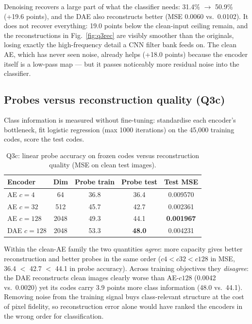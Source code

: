 \documentclass[10pt,twocolumn,letterpaper]{article}
\begin{document}
Denoising recovers a large part of what the classifier needs: 31.4\% $\to$ 50.9\% (+19.6 points), and the DAE also reconstructs better (MSE 0.0060 vs.\ 0.0102).
It does not recover everything: 19.0 points below the clean-input ceiling remain, and the reconstructions in Fig.~\ref{fig:q3rec} are visibly smoother than the originals, losing exactly the high-frequency detail a CNN filter bank feeds on.
The clean AE, which has never seen noise, already helps (+18.0 points) because the encoder itself is a low-pass map --- but it passes noticeably more residual noise into the classifier.

\subsection{Probes versus reconstruction quality (Q3c)}
Class information is measured without fine-tuning: standardise each encoder's bottleneck, fit logistic regression (max 1000 iterations) on the 45{,}000 training codes, score the test codes.

\begin{table}[t]
\centering\small
\begin{tabular}{lcccc}
\toprule
Encoder & Dim & Probe train & Probe test & Test MSE \\
\midrule
AE $c{=}4$ & 64 & 36.8 & 36.4 & 0.009570 \\
AE $c{=}32$ & 512 & 45.7 & 42.7 & 0.002361 \\
AE $c{=}128$ & 2048 & 49.3 & 44.1 & \textbf{0.001967} \\
DAE $c{=}128$ & 2048 & 53.3 & \textbf{48.0} & 0.004231 \\
\bottomrule
\end{tabular}
\caption{Q3c: linear probe accuracy on frozen codes versus reconstruction quality (MSE on clean test images).}
\label{tab:q3c}
\end{table}

Within the clean-AE family the two quantities \emph{agree}: more capacity gives better reconstruction and better probes in the same order ($c4 < c32 < c128$ in MSE, 36.4 $<$ 42.7 $<$ 44.1 in probe accuracy).
Across training objectives they \emph{disagree}: the DAE reconstructs clean images clearly worse than AE-$c128$ (0.0042 vs.\ 0.0020) yet its codes carry 3.9 points more class information (48.0 vs.\ 44.1).
Removing noise from the training signal buys class-relevant structure at the cost of pixel fidelity, so reconstruction error alone would have ranked the encoders in the wrong order for classification.
\end{document}
